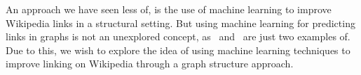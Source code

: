 An approach we have seen less of, is the use of machine learning to improve Wikipedia links in a structural setting. But using machine learning for predicting links in graphs is not an unexplored concept, as~\cite{tang2015line} and~\cite{al2006link} are just two examples of. Due to this, we wish to explore the idea of using machine learning techniques to improve linking on Wikipedia through a graph structure approach.


